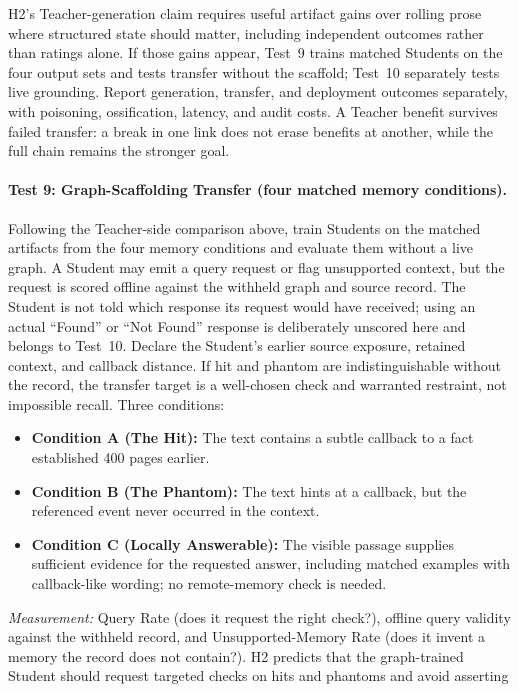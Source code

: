 \documentclass[11pt]{article}
\begin{document}
H2's Teacher-generation claim requires useful artifact gains over rolling prose
where structured state should matter, including independent outcomes rather
than ratings alone. If those gains appear, Test~9 trains matched Students on
the four output sets and tests transfer without the scaffold; Test~10 separately
tests live grounding. Report generation, transfer, and deployment outcomes
separately, with poisoning, ossification, latency, and audit costs. A Teacher
benefit survives failed transfer: a break in one link does not erase benefits
at another, while the full chain remains the stronger goal.

\paragraph{Test 9: Graph-Scaffolding Transfer (four matched memory conditions).}
Following the Teacher-side comparison above, train Students on the matched
artifacts from the four memory conditions and evaluate them without a live
graph. A Student may emit
a query request or flag unsupported context, but the request is scored offline
against the withheld graph and source record. The Student is not told which
response its request would have received; using an actual ``Found'' or ``Not
Found'' response is deliberately unscored here and belongs to Test~10.
Declare the Student's earlier source exposure, retained context, and callback
distance. If hit and phantom are indistinguishable without the record, the
transfer target is a well-chosen check and warranted restraint, not impossible
recall. Three conditions:
\begin{itemize}
    \item \textbf{Condition A (The Hit):} The text contains a subtle
    callback to a fact established 400 pages earlier.
    \item \textbf{Condition B (The Phantom):} The text hints at a callback,
    but the referenced event never occurred in the context.
    \item \textbf{Condition C (Locally Answerable):} The visible passage
    supplies sufficient evidence for the requested answer, including matched
    examples with callback-like wording; no remote-memory check is needed.
\end{itemize}
\emph{Measurement:} Query Rate (does it request the right check?), offline query
validity against the withheld record, and Unsupported-Memory Rate (does it
invent a memory the record does not contain?). H2 predicts that the graph-trained
Student should request targeted checks on hits and phantoms and avoid asserting
\end{document}
